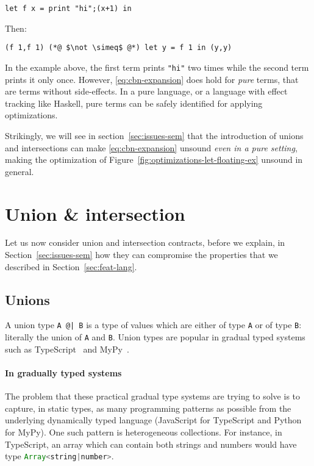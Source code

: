 \documentclass[sigplan,10pt,review,anonymous]{acmart}
\newcommand{\nickel}[1]{\lstinline[language=nickel]{#1}}
\newcommand{\typescript}[1]{\lstinline[language=JavaScript]{#1}}
\begin{document}
\begin{lstlisting}[language=Nickel]
let f x = print "hi";(x+1) in
\end{lstlisting}

Then:

\begin{lstlisting}[language=Nickel]
(f 1,f 1) (*@ $\not \simeq$ @*) let y = f 1 in (y,y)
\end{lstlisting}

In the example above, the first term prints \nickel{"hi"} two times while the
second term prints it only once. However, \ref{eq:cbn-expansion} does hold for
\emph{pure} terms, that are terms without side-effects. In a pure language, or a
language with effect tracking like Haskell, pure terms can be safely identified for applying
optimizations.

Strikingly, we will see in section~\ref{sec:issues-sem} that the introduction of
unions and intersections can make \ref{eq:cbn-expansion} unsound
\emph{even in a pure setting}, making the optimization of
Figure~\ref{fig:optimizations-let-floating-ex} unsound in general.


\section{Union \& intersection}
\label{sec:union-inter}

Let us now consider union and intersection contracts, before we
explain, in Section~\ref{sec:issues-sem} how they can compromise the
properties that we described in Section~\ref{sec:feat-lang}.

\subsection{Unions}

A union type \nickel{A @| B} is a type of values which are either of
type \nickel{A} or of type \nickel{B}: literally the union of
\nickel{A} and \nickel{B}. Union types are popular in gradual typed
systems such as TypeScript~\cite{TypeScriptUnions} and
MyPy~\cite{MyPyOptional}.

\paragraph{In gradually typed systems}

The problem that these practical gradual type systems are trying to solve is to
capture, in static types, as many programming patterns as possible
from the underlying dynamically typed language (JavaScript for
TypeScript and Python for MyPy). One such pattern is
heterogeneous collections. For instance, in TypeScript, an array
which can contain both strings and numbers would have type
\typescript{Array<string|number>}.
\end{document}
